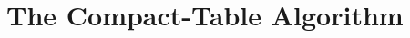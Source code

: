 \documentclass{beamer}
\newcommand{\CurrTable}{\texttt{validTuples}}
\newcommand{\Supports}{\texttt{supports}}
\newcommand{\Residues}{\texttt{residues}}
\begin{document}
\section{The Compact-Table Algorithm}



\end{document}
